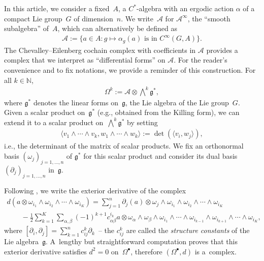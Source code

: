 \documentclass[11pt]{article}
\newcommand{\Aa}{\mathcal{A}}
\newcommand{\LieG}{\mathfrak{g}}
\newcommand{\N}{\mathbb{N}}
\numberwithin{equation}{section}
\begin{document}
In this article, we consider a f\/ixed~$A$, a $C^*$-algebra with an ergodic action $\alpha$ of a compact Lie group~$G$ of dimension~$n$. We write~$\Aa$ for $\Aa^\infty$, the ``smooth subalgebra'' of~$A$, which can alternatively be def\/ined as
\begin{gather*}
\Aa := \{ a \in A \colon g \mapsto \alpha_g(a) \text{ is in }C^\infty (G, A) \}.
\end{gather*}
The Chevalley--Eilenberg cochain complex with coef\/f\/icients in $\Aa$ provides a complex that we interpret as ``dif\/ferential forms'' on $\Aa$. For the reader's convenience and to f\/ix notations, we provide a reminder of this construction. For all $k \in \N$,
\begin{gather*}
\Omega^k := \Aa \otimes \bigwedge^k \LieG^*,
\end{gather*}
where $\LieG^*$ denotes the linear forms on~$\LieG$, the Lie algebra of the Lie group~$G$. Given a scalar product on~$\LieG^*$ (e.g., obtained from the Killing form), we can extend it to a scalar product on~$\bigwedge^k \LieG^*$ by setting
\begin{gather*}
\langle v_1 \wedge \cdots \wedge v_k, w_1 \wedge \cdots \wedge w_k \rangle := \det( \langle v_i, w_j \rangle ),
\end{gather*}
i.e., the determinant of the matrix of scalar products. We f\/ix an orthonormal basis $(\omega_j)_{j = 1, \ldots , n}$ of $\LieG^*$ for this scalar product and consider its dual basis $(\partial _j)_{j=1, \ldots , n}$ in~$\LieG$.

Following \cite[the model of~(4.6), p.~157]{KnappLieGp}, we write the exterior derivative of the complex
\begin{gather}
d( a \otimes \omega_{i_1} \wedge \omega_{i_2} \wedge \cdots \wedge \omega_{i_K} ) =\sum_{j = 1}^n \partial _j(a) \otimes \omega_j \wedge \omega_{i_1} \wedge \omega_{i_2} \wedge \cdots \wedge \omega_{i_K} \nonumber\\
\qquad{}
 - \frac{1}{2} \sum_{k=1}^K \sum_{\alpha, \beta} (-1)^{k+1} c^{i_k}_{\alpha \beta} a \otimes \omega_\alpha \wedge \omega_\beta \wedge \omega_{i_1} \wedge \cdots \wedge \omega_{i_{k-1}} \wedge \omega_{i_{k+1}} \wedge \cdots \wedge \omega_{i_K},\label{Eqn:Defd}
\end{gather}
where $[\partial _i, \partial _j] = \sum\limits_{k=1}^n c^k_{i j} \partial _k$~-- the $c^{k}_{i j}$ are called the \emph{structure constants} of the Lie algebra~$\LieG$. A~lengthy but straightforward computation proves that this exterior derivative satisf\/ies $d^2 = 0$ on~$\Omega^\bullet$, therefore $(\Omega^\bullet , d)$ is a~complex.
\end{document}
